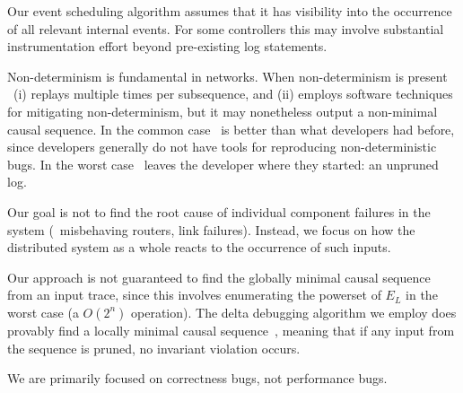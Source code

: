  Our event scheduling algorithm assumes that
it has visibility into the occurrence of all relevant internal events. For
some controllers this may involve substantial instrumentation effort beyond
pre-existing log statements.

 Non-determinism
is fundamental in networks. When non-determinism is present
\projectname~(i) replays multiple times per subsequence, and (ii) employs
software techniques for mitigating non-determinism, but it may nonetheless
output a non-minimal causal sequence. In the common case \projectname~is
better than what developers had before, since developers generally
do not have tools for reproducing non-deterministic bugs.
In the worst case \projectname~leaves the
developer where they started: an unpruned log.



 Our goal is not to find the root
cause of individual component failures in the system (\eg~misbehaving routers,
link failures). Instead, we focus on
how the distributed system as a whole reacts to the occurrence of such inputs.

Our approach is not guaranteed to find the globally minimal
causal sequence from an input trace, since this involves enumerating the powerset of
$E_L$ in the worst case (a $O(2^n)$ operation).
The delta debugging algorithm we employ does provably find a
locally minimal causal sequence~\cite{Zeller:1999:YMP:318773.318946},
meaning that if any input from the sequence is pruned, no invariant violation
occurs.

We are primarily focused on correctness bugs, not performance bugs.

